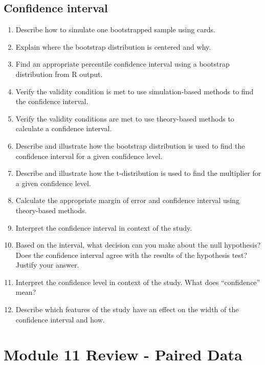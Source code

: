 \documentclass[
]{report}
\begin{document}
\subsection*{Confidence interval}\label{confidence-interval-9}

\begin{enumerate}
\def\labelenumi{\arabic{enumi}.}
\setcounter{enumi}{29}
\item
  Describe how to simulate one bootstrapped sample using cards.
\item
  Explain where the bootstrap distribution is centered and why.
\item
  Find an appropriate percentile confidence interval using a bootstrap distribution from R output.
\item
  Verify the validity condition is met to use simulation-based methods to find the confidence interval.
\item
  Verify the validity conditions are met to use theory-based methods to calculate a confidence interval.
\item
  Describe and illustrate how the bootstrap distribution is used to find the confidence interval for a given confidence level.
\item
  Describe and illustrate how the t-distribution is used to find the multiplier for a given confidence level.
\item
  Calculate the appropriate margin of error and confidence interval using theory-based methods.
\item
  Interpret the confidence interval in context of the study.
\item
  Based on the interval, what decision can you make about the null hypothesis? Does the confidence interval agree with the results of the hypothesis test? Justify your answer.
\item
  Interpret the confidence level in context of the study. What does ``confidence'' mean?
\item
  Describe which features of the study have an effect on the width of the confidence interval and how.
\end{enumerate}

\newpage

\section{Module 11 Review - Paired Data}\label{module-11-review---paired-data}
\end{document}
